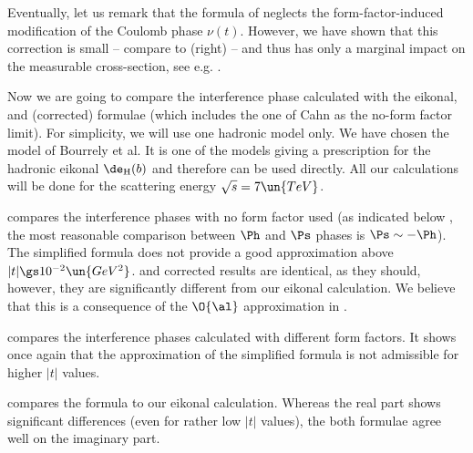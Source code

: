 Eventually, let us remark that the formula of \KaL{} neglects the form-factor-induced modification of the Coulomb phase $\nu(t)$. However, we have shown that this correction is small -- compare  to  (right) -- and thus has only a marginal impact on the measurable cross-section, see e.g. .



Now we are going to compare the interference phase calculated with the eikonal, \WY{} and (corrected) \KL{} formulae (which includes the one of Cahn as the no-form factor limit). For simplicity, we will use one hadronic model only. We have chosen the model of Bourrely et al. It is one of the models giving a prescription for the hadronic eikonal $\de_{\rm H}(b)$ and therefore  can be used directly. All our calculations will be done for the scattering energy $\sqrt s = 7\un{TeV}$.

 compares the interference phases with no form factor used (as indicated below , the most reasonable comparison between $\Ph$ and $\Ps$ phases is $\Ps \sim - \Ph$). The simplified \WY{} formula does not provide a good approximation above $|t| \gs 10^{-2}\un{GeV^2}$. \WY{} and corrected \KL{} results are identical, as they should, however, they are significantly different from our eikonal calculation. We believe that this is a consequence of the $\O{\al}$ approximation in .

 compares the interference phases calculated with different form factors. It shows once again that the approximation of the simplified \WaY{} formula is not admissible for higher $|t|$ values.

 compares the \KL{} formula to our eikonal calculation. Whereas the real part shows significant differences (even for rather low $|t|$ values), the both formulae agree well on the imaginary part.






